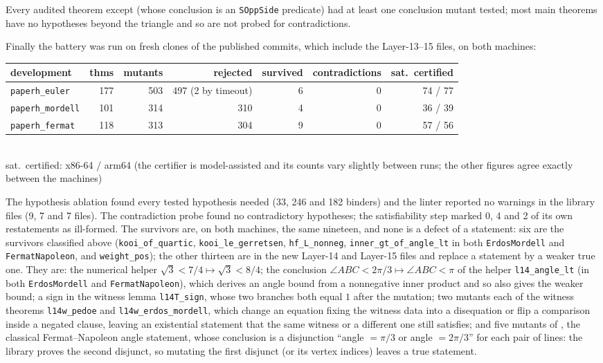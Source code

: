 \documentclass[11pt]{article}
\theoremstyle{definition}
\theoremstyle{remark}
\newcommand{\lean}[1]{\texttt{#1}}
\begin{document}
Every audited theorem except  (whose conclusion is an
\lean{SOppSide} predicate) had at least one conclusion mutant tested; most main theorems have no
hypotheses beyond the triangle and so are not probed for contradictions.

Finally the battery was run on fresh clones of the published commits, which include the
Layer-13--15 files, on both machines:
\begin{center}\small
\begin{tabular}{@{}l r r r r r r@{}}
\toprule
development & thms & mutants & rejected & survived & contradictions & sat.\ certified\\
\midrule
\lean{paperh\_euler} & 177 & 503 & 497 (2 by timeout) & 6 & 0 & 74 / 77\\
\lean{paperh\_mordell} & 101 & 314 & 310 & 4 & 0 & 36 / 39\\
\lean{paperh\_fermat} & 118 & 313 & 304 & 9 & 0 & 57 / 56\\
\bottomrule
\end{tabular}\\[2pt]
{\footnotesize sat.\ certified: x86-64 / arm64 (the certifier is model-assisted and its counts vary
slightly between runs; the other figures agree exactly between the machines)}
\end{center}
The hypothesis ablation found every tested hypothesis needed (33, 246 and 182 binders) and the
linter reported no warnings in the library files (9, 7 and 7 files). The contradiction probe found
no contradictory hypotheses; the satisfiability step marked 0, 4 and 2 of its own restatements as
ill-formed. The survivors are, on both machines, the same nineteen, and none is a defect of a
statement: six are the survivors classified above (\lean{kooi\_of\_quartic},
\lean{kooi\_le\_gerretsen}, \lean{hf\_L\_nonneg}, \lean{inner\_gt\_of\_angle\_lt} in both
\lean{ErdosMordell} and \lean{FermatNapoleon}, and \lean{weight\_pos}); the other thirteen are in the new
Layer-14 and Layer-15 files and replace a statement by a weaker true one. They are: the numerical
helper $\sqrt3<7/4\mapsto\sqrt3<8/4$; the conclusion $\angle ABC<2\pi/3\mapsto\angle ABC<\pi$ of
the helper \lean{l14\_angle\_lt} (in both \lean{ErdosMordell} and \lean{FermatNapoleon}), which derives
an angle bound from a nonnegative inner product and so also gives the weaker bound; a sign in the witness lemma \lean{l14T\_sign}, whose two branches
both equal $1$ after the mutation; two mutants each of the witness theorems \lean{l14w\_pedoe} and
\lean{l14w\_erdos\_mordell}, which change an equation fixing the witness data into a disequation or
flip a comparison inside a negated clause, leaving an existential statement that the same witness or
a different one still satisfies; and five mutants of , the
classical Fermat--Napoleon angle statement, whose conclusion is a disjunction
``angle $=\pi/3$ or angle $=2\pi/3$'' for each pair of lines: the library proves the second
disjunct, so mutating the first disjunct (or its vertex indices) leaves a true statement.
\end{document}
